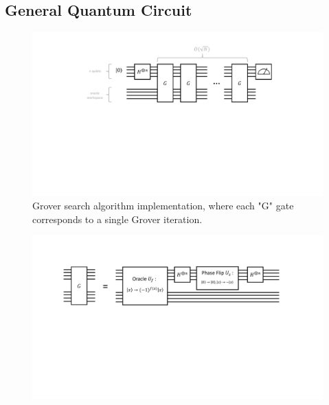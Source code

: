 \documentclass[11pt]{article} %
\begin{document}
\subsection{General Quantum Circuit}
\begin{figure}[h!]
    \centering
    \includegraphics[width=.97\textwidth]{Lecture7Figs/gcircuit.pdf}
    \caption*{Grover search algorithm implementation, where each "G" gate corresponds to a single Grover iteration.}
    \label{fig:search_item}
\end{figure}
\begin{figure}[h!]
    \centering
    \includegraphics[width=.97\textwidth]{Lecture7Figs/giter.pdf}
    \label{fig:search_item}
\end{figure}

\newpage
\end{document}
